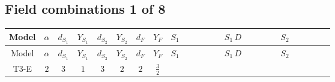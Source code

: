 \documentclass[8pt]{article}
\begin{document}
\begin{landscape}
\subsection*{Field combinations 1 of 8}
\begin{longtable}{@{}cccccccc >{\raggedright\arraybackslash}p{0.21\linewidth} >{\raggedright\arraybackslash}p{0.21\linewidth} >{\raggedright\arraybackslash}p{0.21\linewidth}@{}}
\toprule
Model & $\alpha$ & $d_{S_1}$ & $Y_{S_1}$ & $d_{S_2}$ & $Y_{S_2}$ & $d_F$ & $Y_F$ & $S_1$ & $S_1\,D$ & $S_2$ \\
\midrule
\endfirsthead
\toprule
Model & $\alpha$ & $d_{S_1}$ & $Y_{S_1}$ & $d_{S_2}$ & $Y_{S_2}$ & $d_F$ & $Y_F$ & $S_1$ & $S_1\,D$ & $S_2$ \\
\midrule
\endhead
T3-E & $2$ & $3$ & $1$ & $3$ & $2$ & $2$ & $\frac{3}{2}$ & \scriptsize\adjustbox{max width=\linewidth}{$\begin{gathered} +\frac{2 \hbar  \overline{y_{1,i_1,r_1}} \overline{y_{1,i_2,r_2}} S_{1,j_2}^2 y_{1,i_1,r_2} y_{1,i_2,r_1} \left(S_{1,j_1}{}^{\dagger }\right){}^2}{3 \epsilon } \\ -C_{S_1^\dagger S_1} S_{1,j_1} S_{1,j_1}{}^{\dagger } \\ +\frac{C_{S_1^\dagger S_1} \hbar  \overline{y_{1,i_1,r_1}} S_{1,j_1} y_{1,i_1,r_1} S_{1,j_1}{}^{\dagger }}{\sqrt{3}}\end{gathered}$} & \scriptsize\adjustbox{max width=\linewidth}{$\begin{gathered} +D_{\mu _1}\left(S_{1,j_1}\right){}^{\dagger } D_{\mu _1}\left(S_{1,j_1}\right)\end{gathered}$} & \scriptsize\adjustbox{max width=\linewidth}{$\begin{gathered} +\frac{2 \hbar  \overline{y_{2,i_1,r_1}} \overline{y_{2,i_2,r_2}} S_{2,j_2}^2 y_{2,i_1,r_2} y_{2,i_2,r_1} \left(S_{2,j_1}{}^{\dagger }\right){}^2}{3 \epsilon } \\ -C_{S_2^\dagger S_2} S_{2,j_1} S_{2,j_1}{}^{\dagger } \\ +\frac{C_{S_2^\dagger S_2} \hbar  \overline{y_{2,i_1,r_1}} S_{2,j_1} y_{2,i_1,r_1} S_{2,j_1}{}^{\dagger }}{\sqrt{3}}\end{gathered}$} \\

\end{longtable}
\end{landscape}
\end{document}
